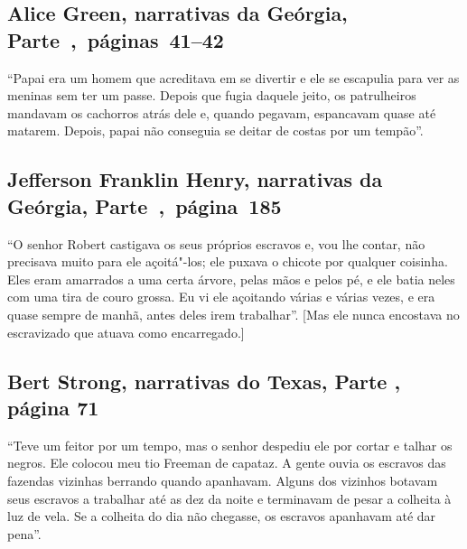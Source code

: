 \subsection{Alice Green, narrativas da Geórgia, Parte~,~páginas~41--42}
\label{ref109}

``Papai era um homem que acreditava em se divertir e ele se escapulia
para ver as meninas sem ter um passe. Depois que fugia daquele jeito, os
patrulheiros mandavam os cachorros atrás dele e, quando pegavam,
espancavam quase até matarem. Depois, papai não conseguia se deitar de
costas por um tempão''.

\subsection{Jefferson Franklin Henry, narrativas da Geórgia, Parte~,~página~185}
\label{ref139}

``O senhor Robert castigava os seus próprios escravos e, vou lhe contar,
não precisava muito para ele açoitá"-los; ele puxava o chicote por
qualquer coisinha. Eles eram amarrados a uma certa árvore, pelas mãos e
pelos pé, e ele batia neles com uma tira de couro grossa. Eu vi ele
açoitando várias e várias vezes, e era quase sempre de manhã, antes
deles irem trabalhar''. {[}Mas ele nunca encostava no escravizado que atuava
como encarregado.{]}

\subsection{Bert Strong, narrativas do Texas, Parte , página 71}
\label{ref258}

``Teve um feitor por um tempo, mas o senhor despediu ele por cortar e
talhar os negros. Ele colocou meu tio Freeman de capataz. A gente ouvia
os escravos das fazendas vizinhas berrando quando apanhavam. Alguns dos
vizinhos botavam seus escravos a trabalhar até as dez da noite e
terminavam de pesar a colheita à luz de vela. Se a colheita do dia não
chegasse, os escravos apanhavam até dar pena''.

